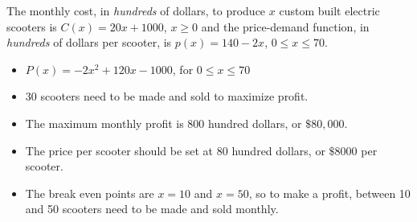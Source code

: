 {The monthly cost, in \emph{hundreds} of dollars, to produce $x$ custom built electric scooters is $C(x) = 20x + 1000$, $x \geq 0$ and the price-demand function, in \emph{hundreds} of dollars per scooter,  is $p(x) = 140-2x$, $0 \leq x \leq 70$.}
{\begin{itemize}

\item  $P(x) = -2x^2+120x-1000$, for $0 \leq x \leq 70$

\item  $30$ scooters need to be made and sold to maximize profit.

\item  The maximum monthly profit is $800$ hundred dollars, or $\$80,\!000$.

\item The price per scooter should be set at $80$ hundred dollars, or $\$8000$ per scooter.

\item  The break even points are $x=10$ and $x=50$, so to make a profit, between 10 and 50 scooters  need to be made and sold monthly.

\end{itemize}
}